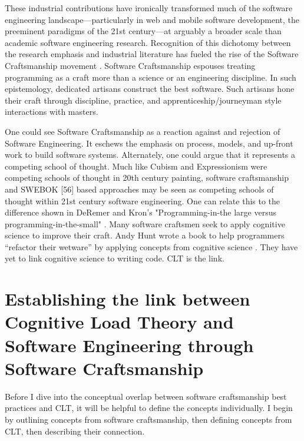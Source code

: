 These industrial contributions have ironically transformed much of the software engineering landscape—particularly in web and mobile software development, the preeminent paradigms of the 21st century—at arguably a broader scale than academic software engineering research. Recognition of this dichotomy between the research emphasis and industrial literature has fueled the rise of the Software Craftsmanship movement \cite{McBreen2001}. Software Craftsmanship espouses treating programming as a craft more than a science or an engineering discipline. In such epistemology, dedicated artisans construct the best software. Such artisans hone their craft through discipline, practice, and apprenticeship/journeyman style interactions with masters.


One could see Software Craftsmanship as a reaction against and rejection of Software Engineering. It eschews the emphasis on process, models, and up-front work to build software systems. Alternately, one could argue that it represents a competing school of thought. Much like Cubism and Expressionism were competing schools of thought in 20th century painting, software craftsmanship and SWEBOK \cite{Abran2001} [56]  based approaches may be seen as competing schools of thought within 21st century software engineering. One can relate this to the difference shown in DeRemer and Kron’s "Programming-in-the large versus programming-in-the-small" \cite{DeRemer1975}. Many software craftsmen seek to apply cognitive science to improve their craft. Andy Hunt wrote a book to help programmers “refactor their wetware” by applying concepts from cognitive science \cite{Hunt2008}. They have yet to link cognitive science to writing code. CLT is the link.

\section{Establishing the link between Cognitive Load Theory and Software Engineering through Software Craftsmanship}

Before I dive into the conceptual overlap between software craftsmanship best practices and CLT, it will be helpful to define the concepts individually. I begin by outlining concepts from software craftsmanship, then defining concepts from CLT, then describing their connection.

